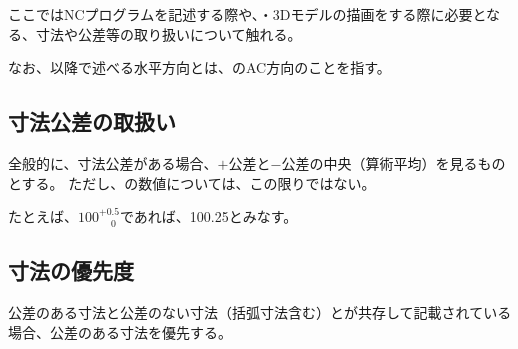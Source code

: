 

ここではNCプログラムを記述する際や、\nameDrawing・3Dモデルの描画をする際に必要となる、寸法や公差等の取り扱いについて触れる。

なお、以降で述べる水平方向とは、\EndFace のAC方向のことを指す。





\subsection{寸法公差の取扱い}
全般的に、寸法公差がある場合、$+$公差と$-$公差の中央（算術平均）を見るものとする。
ただし、\IDTaperTable の数値については、この限りではない。
\begin{hosoku}
たとえば、$100^{+0.5}_{\phantom -0}$であれば、100.25とみなす。
\end{hosoku}


\subsection{寸法の優先度}
公差のある寸法と公差のない寸法（括弧寸法含む）とが共存して記載されている場合、公差のある寸法を優先する。

